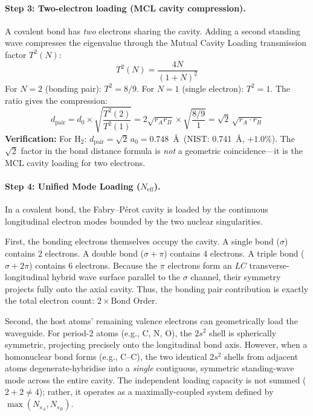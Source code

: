 \paragraph{Step 3: Two-electron loading (MCL cavity compression).}
A covalent bond has \emph{two} electrons sharing the cavity. Adding a second standing wave compresses the eigenvalue through the Mutual Cavity Loading transmission factor $T^2(N)$:
\begin{equation}
    T^2(N) = \frac{4N}{(1+N)^2}
\end{equation}
For $N=2$ (bonding pair): $T^2 = 8/9$. For $N=1$ (single electron): $T^2 = 1$. The ratio gives the compression:
\begin{equation}
    d_\text{pair} = d_0 \times \sqrt{\frac{T^2(2)}{T^2(1)}} 
    = 2\sqrt{r_A r_B} \times \sqrt{\frac{8/9}{1}}
    = \sqrt{2}\,\sqrt{r_A \cdot r_B}
    \label{eq:fp_two_electron}
\end{equation}
\textbf{Verification:} For H$_2$: $d_\text{pair} = \sqrt{2}\,a_0 = 0.748$~\AA\ (NIST: 0.741~\AA, $+1.0\%$). The $\sqrt{2}$ factor in the bond distance formula is \emph{not} a geometric coincidence---it is the MCL cavity loading for two electrons.

\paragraph{Step 4: Unified Mode Loading ($N_\text{eff}$).}
In a covalent bond, the Fabry--P\'{e}rot cavity is loaded by the continuous longitudinal electron modes bounded by the two nuclear singularities. 

First, the bonding electrons themselves occupy the cavity. A single bond ($\sigma$) contains 2 electrons. A double bond ($\sigma + \pi$) contains 4 electrons. A triple bond ($\sigma + 2\pi$) contains 6 electrons. Because the $\pi$ electrons form an $LC$ transverse-longitudinal hybrid wave surface parallel to the $\sigma$ channel, their symmetry projects fully onto the axial cavity. Thus, the bonding pair contribution is exactly the total electron count: $2 \times \text{Bond Order}$.

Second, the host atoms' remaining valence electrons can geometrically load the waveguide. For period-2 atoms (e.g., C, N, O), the $2s^2$ shell is spherically symmetric, projecting precisely onto the longitudinal bond axis. However, when a homonuclear bond forms (e.g., C--C), the two identical $2s^2$ shells from adjacent atoms degenerate-hybridise into a \emph{single} contiguous, symmetric standing-wave mode across the entire cavity. The independent loading capacity is not summed ($2+2 \neq 4$); rather, it operates as a maximally-coupled system defined by $\max(N_{s_A}, N_{s_B})$. 


